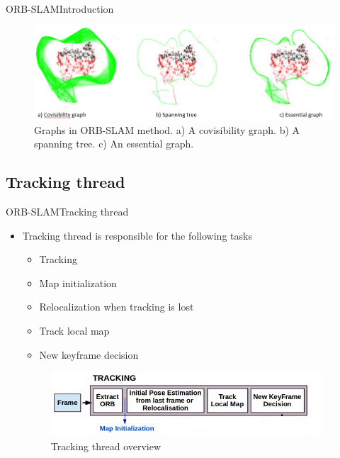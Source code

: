 \documentclass{beamer}
\begin{document}
\begin{frame}{ORB-SLAM}{Introduction}
    \begin{figure}
\includegraphics[scale=0.4]{Figure/Graphs}
\caption{Graphs in ORB-SLAM method. a) A covisibility graph. b) A spanning tree. c) An essential graph.}
\end{figure}
  
\end{frame}

\subsection{Tracking thread}
\begin{frame}{ORB-SLAM}{Tracking thread}
  \begin{itemize}
      \item{
      Tracking thread is responsible for the following tasks
      \begin{itemize}
          \item{
          Tracking       
          }
          \item{
          Map initialization
          }
          \item{
          Relocalization when tracking is lost
          }
          \item{
          Track local map
          }
          \item{
          New keyframe decision
          }
      \end{itemize}
      }
      \begin{figure}
          \centering
          \includegraphics[scale=0.9]{Figure/Tracking}
          \caption{Tracking thread overview}
      \end{figure}
      
  \end{itemize}
\end{frame}
\end{document}
